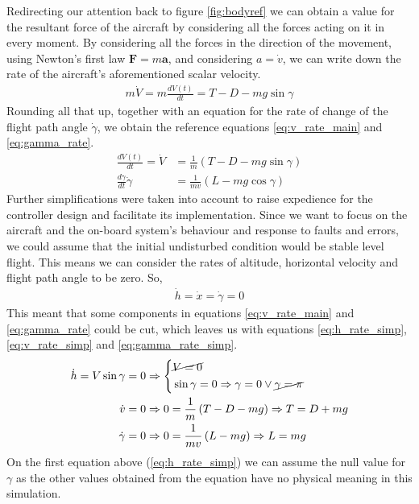 \documentclass[english,palatino]{ist-report}
\begin{document}
Redirecting our attention back to figure \ref{fig:bodyref} we can obtain a value for the resultant force of the aircraft by considering all the forces acting on it in every moment. By considering all the forces in the direction of the movement, using Newton's first law $\mathbf{F} = m\mathbf{a}$, and considering $a = \dot{v}$, we can write down the rate of the aircraft's aforementioned scalar velocity.
\begin{gather}\label{eq:v_rate}
	m\dot{V} = m\frac{dV(t)}{dt} = T - D - mg\sin\gamma
\end{gather}
Rounding all that up, together with an equation for the rate of change of the flight path angle $\dot{\gamma}$, we obtain the reference equations \ref{eq:v_rate_main} and \ref{eq:gamma_rate}.
\begin{align}
	\label{eq:v_rate_main}
	\frac{dV(t)}{dt} = \dot{V} &= \frac{1}{m}\left(T - D - mg\sin\gamma\right) \\
	\label{eq:gamma_rate}
	\frac{d\gamma}{dt} \dot{\gamma} &= \frac{1}{mv}\left(L - mg\cos\gamma\right)
\end{align}
Further simplifications were taken into account to raise expedience for the controller design and facilitate its implementation. Since we want to focus on the aircraft and the on-board system's behaviour and response to faults and errors, we could assume that the initial undisturbed condition would be stable level flight. This means we can consider the rates of altitude, horizontal velocity and flight path angle to be zero. So,
\begin{gather*}
	\dot{h} = \dot{x} = \dot{\gamma} = 0
\end{gather*}
This meant that some components in equations \ref{eq:v_rate_main} and \ref{eq:gamma_rate} could be cut, which leaves us with equations \ref{eq:h_rate_simp}, \ref{eq:v_rate_simp} and \ref{eq:gamma_rate_simp}.
\begin{align}
	\label{eq:h_rate_simp}
	\dot{h} = V\sin\gamma = 0 &\Rightarrow \left\{\begin{aligned}
		&\cancel{V = 0} \\
		&\sin\gamma = 0 \Rightarrow \gamma = 0 \vee \cancel{\gamma = \pi}
	\end{aligned}\right. \\
	\label{eq:v_rate_simp}
	\dot{v} = 0 &\Rightarrow 0 = \frac{1}{m}\left(T - D - mg\right) \Rightarrow T = D + mg \\
	\label{eq:gamma_rate_simp}
	\dot{\gamma} = 0 &\Rightarrow 0 = \frac{1}{mv}\left(L - mg\right) \Rightarrow L = mg
\end{align}
On the first equation above (\ref{eq:h_rate_simp}) we can assume the null value for $\gamma$ as the other values obtained from the equation have no physical meaning in this simulation.
\end{document}
